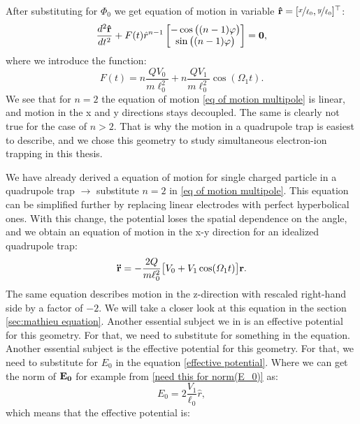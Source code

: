 After substituting for $\Phi_0$ we get equation of motion in variable $\vb{\hat{r}} = [\nicefrac{x}{\ell_0},\nicefrac{y}{\ell_0}]^\top$:
\begin{equation}
	\label{eq of motion multipole}
	\dfrac{d^2\vb{\hat{r}}}{dt^2} + F(t) \hat{r}^{n-1}
	\begin{bmatrix}
		-\cos\big((n-1)\varphi\big) \\
		\sin\big((n-1)\varphi\big)
	\end{bmatrix} = \vb{0},
\end{equation}
where we introduce the function:
\begin{equation}
	F(t) = n\dfrac{Q V_0}{m \ell_0^2} + n\dfrac{Q V_1}{m \ell_0^2} \cos(\Omega_1 t).
\end{equation}
We see that for $n = 2$ the equation of motion \eqref{eq of motion multipole} is linear, and motion in the x and y directions stays decoupled. The same is clearly not true for the case of $n > 2$. That is why the motion in a quadrupole trap is easiest to describe, and we chose this geometry to study simultaneous electron-ion trapping in this thesis.

\label{sec:quadrupole trap}

We have already derived a equation of motion for single charged particle in a quadrupole trap $\rightarrow$ substitute $n = 2$ in \eqref{eq of motion multipole}. This equation can be simplified further by replacing linear electrodes with perfect hyperbolical ones. With this change, the potential loses the spatial dependence on the angle, and we obtain an equation of motion in the x-y direction for an idealized quadrupole trap:
\begin{equation}
	\label{eq of motion hyperbolic electrodes}
	\vb{\ddot{r}} = -\dfrac{2Q}{m \ell_0^2} \big[V_0 + V_1 \cos(\Omega_1 t)\big] \vb{r}.
\end{equation}
The same equation describes motion in the z-direction with rescaled right-hand side by a factor of $-2$. We will take a closer look at this equation in the section \ref{sec:mathieu equation}. Another essential subject we in is an effective potential for this geometry. For that, we need to substitute for something in the equation. Another essential subject is the effective potential for this geometry. For that, we need to substitute for $E_0$ in the equation \eqref{effective potential}. Where we can get the norm of $\vb{E_0}$ for example from \eqref{need this for norm(E_0)} as:
\begin{equation}
	\label{norm(E_0)}
	E_0 = 2 \dfrac{V_1}{\ell_0}\hat{r},
\end{equation}
which means that the effective potential is:


